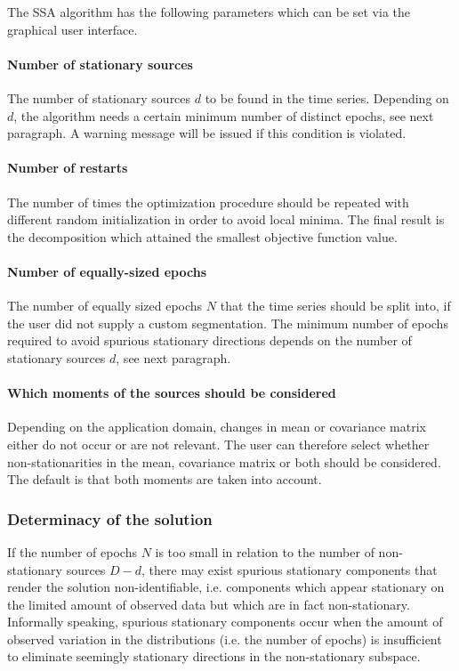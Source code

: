 \documentclass{article}
\newcommand{\1}{\ensuremath{\mathds{1}}}
\newcommand{\0}{\ensuremath{0}}
\begin{document}
The SSA algorithm has the following parameters which can be set via the graphical 
user interface.

\paragraph{Number of stationary sources} The number of stationary sources $d$ to be 
found in the time series. Depending on $d$, the algorithm needs a certain minimum number 
of distinct epochs, see next paragraph. A warning message will be issued
if this condition is violated.

\paragraph{Number of restarts} The number of times the optimization procedure
should be repeated with different random initialization in order to avoid local minima.
The final result is the decomposition which attained the smallest objective function
value.

\paragraph{Number of equally-sized epochs} The number of equally sized epochs $N$ that 
the time series should be split into, if the user did not supply a custom segmentation.
The minimum number of epochs required to avoid spurious
stationary directions depends on the number of stationary sources $d$, see next paragraph. 

\paragraph{Which moments of the sources should be considered} Depending on the application domain, 
changes in mean or covariance matrix either do not occur or are not relevant. The user can therefore 
select whether non-stationarities in the mean, covariance matrix or both should be considered. 
The default is that both moments are taken into account.

\subsubsection*{Determinacy of the solution}
\label{sec:determinacy}

If the number of epochs $N$ is too small in relation to the number of 
non-stationary sources $D-d$, there may exist spurious stationary components that render
the solution non-identifiable, i.e. components which appear stationary on the
limited amount of observed data but which are in fact non-stationary.
Informally speaking, spurious stationary components occur when the amount of 
observed variation in the distributions (i.e. the number of epochs) is insufficient 
to eliminate seemingly stationary directions in the non-stationary subspace. 
\end{document}
